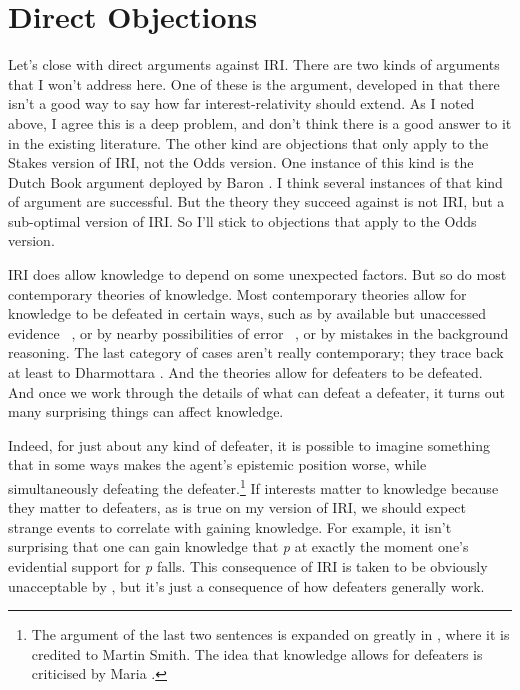 \section{Direct Objections}
\label{directobjections}

Let's close with direct arguments against IRI. There are two kinds of arguments that I won't address here. One of these is the argument, developed in  \citet{IchikawaEtAl2012} that there isn't a good way to say how far interest-relativity should extend. As I noted above, I agree this is a deep problem, and don't think there is a good answer to it in the existing literature. The other kind are objections that only apply to the Stakes version of IRI, not the Odds version. One instance of this kind is the Dutch Book argument deployed by Baron  \citet{Reed2014}. I think several instances of that kind of argument are successful. But the theory they succeed against is not IRI, but a sub-optimal version of IRI. So I'll stick to objections that apply to the Odds version.

IRI does allow knowledge to depend on some unexpected factors. But so do most contemporary theories of knowledge. Most contemporary theories allow for knowledge to be defeated in certain ways, such as by available but unaccessed evidence ~\citep[75]{Harman1973}, or by nearby possibilities of error ~\citep{Goldman1976}, or by mistakes in the background reasoning. The last category of cases aren't really contemporary; they trace back at least to Dharmottara  \citet[58]{Nagel2014}. And the theories allow for defeaters to be defeated. And once we work through the details of what can defeat a defeater, it turns out many surprising things can affect knowledge.

Indeed, for just about any kind of defeater, it is possible to imagine something that in some ways makes the agent's epistemic position worse, while simultaneously defeating the defeater.\footnote{The argument of the last two sentences is expanded on greatly in  \citet[§3]{Weatherson2014-ProbScept}, where it is credited to Martin Smith. The idea that knowledge allows for defeaters is criticised by Maria  \citet{Lasonen-Aarnio2014}.} If interests matter to knowledge because they matter to defeaters, as is true on my version of IRI, we should expect strange events to correlate with gaining knowledge. For example, it isn't surprising that one can gain knowledge that \emph{p} at exactly the moment one's evidential support for \emph{p} falls. This consequence of IRI is taken to be obviously unacceptable by  \citet{EatonPickvance2015}, but it's just a consequence of how defeaters generally work.

